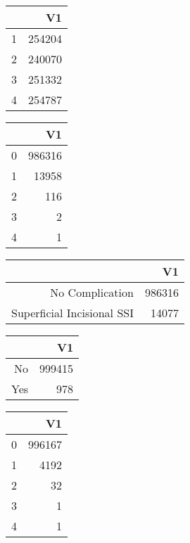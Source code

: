 \bigskip\bigskip
\centering
\begin{tabular}{rr}
  \hline
 & V1 \\ 
  \hline
1 & 254204 \\ 
  2 & 240070 \\ 
  3 & 251332 \\ 
  4 & 254787 \\ 
   \hline
\end{tabular}

\bigskip\bigskip
\centering
\begin{tabular}{rr}
  \hline
 & V1 \\ 
  \hline
0 & 986316 \\ 
  1 & 13958 \\ 
  2 & 116 \\ 
  3 &   2 \\ 
  4 &   1 \\ 
   \hline
\end{tabular}

\bigskip\bigskip
\centering
\begin{tabular}{rr}
  \hline
 & V1 \\ 
  \hline
No Complication & 986316 \\ 
  Superficial Incisional SSI & 14077 \\ 
   \hline
\end{tabular}

\bigskip\bigskip
\centering
\begin{tabular}{rr}
  \hline
 & V1 \\ 
  \hline
No & 999415 \\ 
  Yes & 978 \\ 
   \hline
\end{tabular}

\bigskip\bigskip
\centering
\begin{tabular}{rr}
  \hline
 & V1 \\ 
  \hline
0 & 996167 \\ 
  1 & 4192 \\ 
  2 &  32 \\ 
  3 &   1 \\ 
  4 &   1 \\ 
   \hline
\end{tabular}

